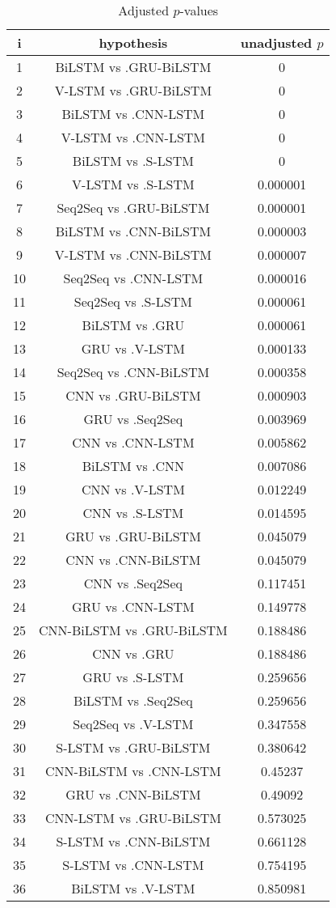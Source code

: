 \documentclass[a4paper,10pt]{article}
\begin{document}
\begin{landscape}
\begin{table}[!htp]
\centering\scriptsize
\begin{tabular}{ccc}
i&hypothesis&unadjusted $p$\\
\hline1&BiLSTM vs .GRU-BiLSTM&0\\
2&V-LSTM vs .GRU-BiLSTM&0\\
3&BiLSTM vs .CNN-LSTM&0\\
4&V-LSTM vs .CNN-LSTM&0\\
5&BiLSTM vs .S-LSTM&0\\
6&V-LSTM vs .S-LSTM&0.000001\\
7&Seq2Seq vs .GRU-BiLSTM&0.000001\\
8&BiLSTM vs .CNN-BiLSTM&0.000003\\
9&V-LSTM vs .CNN-BiLSTM&0.000007\\
10&Seq2Seq vs .CNN-LSTM&0.000016\\
11&Seq2Seq vs .S-LSTM&0.000061\\
12&BiLSTM vs .GRU&0.000061\\
13&GRU vs .V-LSTM&0.000133\\
14&Seq2Seq vs .CNN-BiLSTM&0.000358\\
15&CNN vs .GRU-BiLSTM&0.000903\\
16&GRU vs .Seq2Seq&0.003969\\
17&CNN vs .CNN-LSTM&0.005862\\
18&BiLSTM vs .CNN&0.007086\\
19&CNN vs .V-LSTM&0.012249\\
20&CNN vs .S-LSTM&0.014595\\
21&GRU vs .GRU-BiLSTM&0.045079\\
22&CNN vs .CNN-BiLSTM&0.045079\\
23&CNN vs .Seq2Seq&0.117451\\
24&GRU vs .CNN-LSTM&0.149778\\
25&CNN-BiLSTM vs .GRU-BiLSTM&0.188486\\
26&CNN vs .GRU&0.188486\\
27&GRU vs .S-LSTM&0.259656\\
28&BiLSTM vs .Seq2Seq&0.259656\\
29&Seq2Seq vs .V-LSTM&0.347558\\
30&S-LSTM vs .GRU-BiLSTM&0.380642\\
31&CNN-BiLSTM vs .CNN-LSTM&0.45237\\
32&GRU vs .CNN-BiLSTM&0.49092\\
33&CNN-LSTM vs .GRU-BiLSTM&0.573025\\
34&S-LSTM vs .CNN-BiLSTM&0.661128\\
35&S-LSTM vs .CNN-LSTM&0.754195\\
36&BiLSTM vs .V-LSTM&0.850981\\
\hline
\end{tabular}
\caption{Adjusted $p$-values}
\end{table}

\end{landscape}
\end{document}

